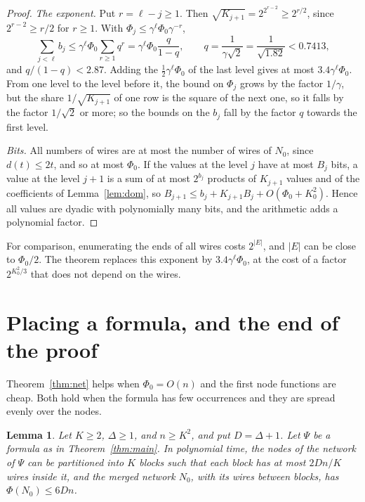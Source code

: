 \documentclass[11pt]{article}
\newtheorem{lemma}[theorem]{Lemma}
\begin{document}
\begin{proof}
\emph{The exponent.} Put $r=\ell-j\ge1$. Then $\sqrt{K_{j+1}}=2^{2^{r-2}}\ge2^{r/2}$, since $2^{r-2}\ge r/2$ for $r\ge1$. With $\Phi_j\le\gamma^{\ell}\Phi_0\gamma^{-r}$,
\[
\sum_{j<\ell}b_j\le\gamma^\ell\Phi_0\sum_{r\ge1}q^r=\gamma^\ell\Phi_0\frac q{1-q},\qquad q=\frac1{\gamma\sqrt2}=\frac1{\sqrt{1.82}}<0.7413,
\]
and $q/(1-q)<2.87$. Adding the $\frac12\gamma^\ell\Phi_0$ of the last level gives at most $3.4\gamma^\ell\Phi_0$. From one level to the level before it, the bound on $\Phi_j$ grows by the factor $1/\gamma$, but the share $1/\sqrt{K_{j+1}}$ of one row is the square of the next one, so it falls by the factor $1/\sqrt2$ or more; so the bounds on the $b_j$ fall by the factor $q$ towards the first level.

\emph{Bits.} All numbers of wires are at most the number of wires of $N_0$, since $d(t)\le2t$, and so at most $\Phi_0$. If the values at the level $j$ have at most $B_j$ bits, a value at the level $j+1$ is a sum of at most $2^{b_j}$ products of $K_{j+1}$ values and of the coefficients of Lemma~\ref{lem:dom}, so $B_{j+1}\le b_j+K_{j+1}B_j+O(\Phi_0+K_0^2)$. Hence all values are dyadic with polynomially many bits, and the arithmetic adds a polynomial factor.
\end{proof}

For comparison, enumerating the ends of all wires costs $2^{|E|}$, and $|E|$ can be close to $\Phi_0/2$. The theorem replaces this exponent by $3.4\gamma^\ell\Phi_0$, at the cost of a factor $2^{K_0^2/3}$ that does not depend on the wires.

\section{Placing a formula, and the end of the proof}\label{sec:place}

Theorem~\ref{thm:net} helps when $\Phi_0=O(n)$ and the first node functions are cheap. Both hold when the formula has few occurrences and they are spread evenly over the nodes.

\begin{lemma}\label{lem:place}
Let $K\ge2$, $\Delta\ge1$, and $n\ge K^2$, and put $D=\Delta+1$. Let $\Psi$ be a formula as in Theorem~\ref{thm:main}. In polynomial time, the nodes of the network of $\Psi$ can be partitioned into $K$ blocks such that each block has at most $2Dn/K$ wires inside it, and the merged network $N_0$, with its wires between blocks, has $\Phi(N_0)\le6Dn$.
\end{lemma}
\end{document}
